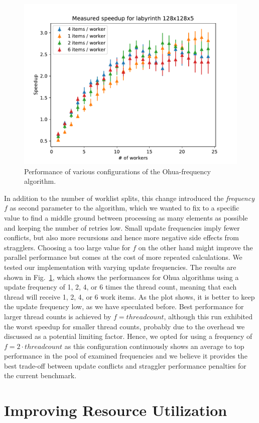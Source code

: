 \begin{figure}[!b]
    \centering
    \includegraphics[width=.5\textwidth,keepaspectratio]{gfx/preliminaries-labyrinth/freq-128x128x5}
    \caption{Performance of various configurations of the Ohua-frequency algorithm.}%
    \label{fig:preliminaries:frequencies}
\end{figure}

In addition to the number of worklist splits, this change introduced the \emph{frequency} $f$ as second parameter to the algorithm, which we wanted to fix to a specific value to find a middle ground between processing as many elements as possible and keeping the number of retries low.
Small update frequencies imply fewer conflicts, but also more recursions and hence more negative side effects from stragglers.
Choosing a too large value for $f$ on the other hand might improve the parallel performance but comes at the cost of more repeated calculations.
We tested our implementation with varying update frequencies.
The results are shown in Fig.~\ref{fig:preliminaries:frequencies}, which shows the performances for Ohua algorithms using a update frequency of 1, 2, 4, or 6 times the thread count, meaning that each thread will receive 1, 2, 4, or 6 work items.
As the plot shows, it is better to keep the update frequency low, as we have speculated before.
Best performance for larger thread counts is achieved by $f = threadcount$, although this run exhibited the worst speedup for smaller thread counts, probably due to the overhead we discussed as a potential limiting factor.
Hence, we opted for using a frequency of $f = 2 \cdot threadcount$ as this configuration continuously shows an average to top performance in the pool of examined frequencies and we believe it provides the best trade-off between update conflicts and straggler performance penalties for the current benchmark.


\section{Improving Resource Utilization}
\label{sec:preliminaries:futures}

